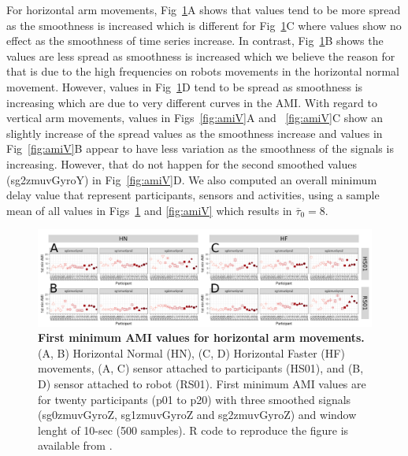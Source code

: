 For horizontal arm movements, 
Fig~\ref{fig:amiH}A shows that values tend to be more spread 
as the smoothness is increased which is different for Fig~\ref{fig:amiH}C
where values show no effect as the smoothness of time series increase.
In contrast, 
Fig~\ref{fig:amiH}B shows the values are less spread as smoothness 
is increased which we believe the reason for that is due to the high 
frequencies on robots movements in the horizontal normal movement.
However, values in Fig~\ref{fig:amiH}D tend to be spread as
smoothness is increasing which are due to very different curves in the AMI.
With regard to vertical arm movements,
values in Figs~\ref{fig:amiV}A and ~\ref{fig:amiV}C 
show an slightly increase of the spread values as the smoothness increase
and values in Fig~\ref{fig:amiV}B appear to have less variation as
the smoothness of the signals is increasing. However, 
that do not happen for the second smoothed values (sg2zmuvGyroY) in Fig~\ref{fig:amiV}D.
We also computed an overall minimum delay value that represent participants,
sensors and activities, using a sample mean of all values in 
Figs~\ref{fig:amiH} and \ref{fig:amiV} which results in $\overline{\tau}_0=8$.
\begin{figure}[!h]
\centering
\includegraphics[width=1.0\textwidth]{ami_aHw10}
	\caption{
	{\bf First minimum AMI values for horizontal arm movements.}
		(A, B) Horizontal Normal (HN), (C, D) Horizontal Faster (HF) movements,
		(A, C) sensor attached to participants (HS01), and
		(B, D) sensor attached to robot (RS01).
		First minimum AMI values are for twenty participants (p01 to p20) 
		with three smoothed signals (sg0zmuvGyroZ, sg1zmuvGyroZ and sg2zmuvGyroZ) 
		and  window lenght of 10-sec (500 samples).
		R code to reproduce the figure is available from \cite{hwum2018}.
        }
    \label{fig:amiH}
\end{figure}

